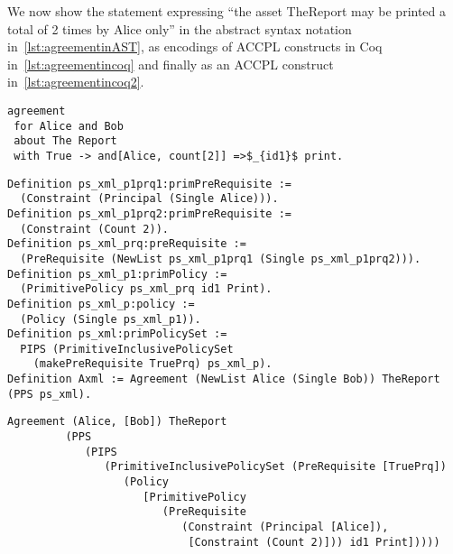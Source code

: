 \documentclass[runningheads,a4paper]{llncs}
\begin{document}
We now show the statement expressing ``the asset TheReport may be printed a total of 2 times by Alice only'' in the abstract syntax notation in~\ref{lst:agreementinAST}, as encodings of \ac{ACCPL} constructs in Coq in~\ref{lst:agreementincoq} and finally as an \ac{ACCPL} construct in~\ref{lst:agreementincoq2}.

\lstset{language=Pucella2006}
\begin{minipage}[c]{0.95\textwidth}
\begin{lstlisting}[frame=single, caption={First Agreement for Alice and Bob}, label={lst:agreementinAST}, mathescape]
agreement
 for Alice and Bob
 about The Report
 with True -> and[Alice, count[2]] =>$_{id1}$ print.
\end{lstlisting}
\end{minipage}

\begin{minipage}[c]{0.95\textwidth}
\begin{lstlisting}
Definition ps_xml_p1prq1:primPreRequisite := 
  (Constraint (Principal (Single Alice))).
Definition ps_xml_p1prq2:primPreRequisite := 
  (Constraint (Count 2)).
Definition ps_xml_prq:preRequisite := 
  (PreRequisite (NewList ps_xml_p1prq1 (Single ps_xml_p1prq2))).
Definition ps_xml_p1:primPolicy := 
  (PrimitivePolicy ps_xml_prq id1 Print).
Definition ps_xml_p:policy := 
  (Policy (Single ps_xml_p1)).
Definition ps_xml:primPolicySet :=
  PIPS (PrimitiveInclusivePolicySet
    (makePreRequisite TruePrq) ps_xml_p).
Definition Axml := Agreement (NewList Alice (Single Bob)) TheReport (PPS ps_xml).
\end{lstlisting}
\end{minipage} 

\begin{minipage}[c]{0.95\textwidth}
\begin{lstlisting}
Agreement (Alice, [Bob]) TheReport
         (PPS
            (PIPS
               (PrimitiveInclusivePolicySet (PreRequisite [TruePrq])
                  (Policy
                     [PrimitivePolicy
                        (PreRequisite
                           (Constraint (Principal [Alice]),
                            [Constraint (Count 2)])) id1 Print]))))

\end{lstlisting}
\end{minipage} 
\end{document}

